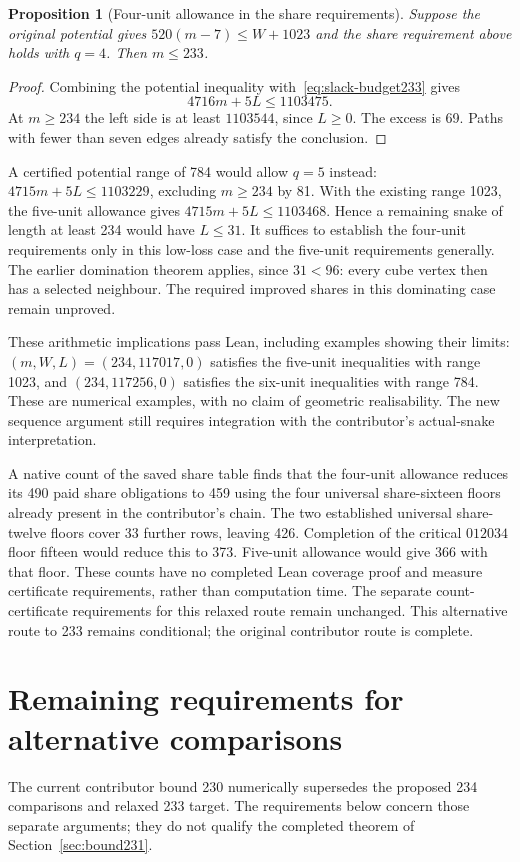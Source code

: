 \documentclass[11pt,a4paper]{article}
\newtheorem{proposition}[theorem]{Proposition}
\theoremstyle{definition}
\theoremstyle{remark}
\begin{document}
\begin{proposition}[Four-unit allowance in the share requirements]
Suppose the original potential gives $520(m-7)\le W+1023$ and the
share requirement above holds with $q=4$. Then $m\le233$.
\end{proposition}
\begin{proof}
Combining the potential inequality with~\eqref{eq:slack-budget233} gives
\[
4716m+5L\le1103475.
\]
At $m\ge234$ the left side is at least $1103544$, since $L\ge0$.
The excess is 69. Paths with fewer than seven edges already satisfy
the conclusion.
\end{proof}

A certified potential range of 784 would allow $q=5$ instead:
$4715m+5L\le1103229$, excluding $m\ge234$ by 81. With the existing
range 1023, the five-unit allowance gives
$4715m+5L\le1103468$. Hence a remaining snake of length at least 234
would have $L\le31$. It suffices to establish the four-unit requirements
only in this low-loss case and the five-unit requirements generally.
The earlier domination theorem applies, since $31<96$: every cube vertex
then has a selected neighbour. The required improved shares in this
dominating case remain unproved.

These arithmetic implications pass Lean, including examples showing their
limits: $(m,W,L)=(234,117017,0)$ satisfies the five-unit inequalities with
range 1023, and $(234,117256,0)$ satisfies the six-unit inequalities with
range 784. These are numerical examples, with no claim of geometric
realisability. The new sequence argument still requires integration with
the contributor's actual-snake interpretation.

A native count of the saved share table finds that the four-unit allowance
reduces its 490 paid share obligations to 459 using the four universal
share-sixteen floors already present in the contributor's chain.
The two established universal share-twelve floors cover 33 further rows,
leaving 426. Completion of the critical $012034$ floor fifteen would
reduce this to 373. Five-unit allowance would give 366 with that floor.
These counts have no completed Lean coverage proof and measure certificate
requirements, rather than computation time. The separate count-certificate
requirements for this relaxed route remain unchanged. This alternative
route to 233 remains conditional; the original contributor route is complete.

\section{Remaining requirements for alternative comparisons}\label{sec:closure}
The current contributor bound 230 numerically supersedes the proposed
234 comparisons and relaxed 233 target. The requirements below concern
those separate arguments; they do not qualify the completed theorem of
Section~\ref{sec:bound231}.
\end{document}
